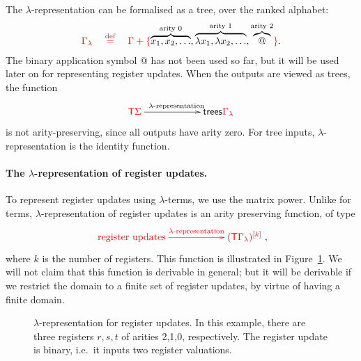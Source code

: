 The  $\lambda$-representation can be formalised as a tree, over the ranked alphabet:
\begin{align*}
{\color{red}{ \Gamma_\lambda \quad \stackrel{\text{def}}=\quad \Gamma + \{{\color{black}{\overbrace{x_1,x_2,\ldots}^\text{arity 0},\overbrace{\lambda x_1,\lambda x_2,\ldots}^\text{arity 1}, \overbrace{@}^{\text{arity 2}}}}\}}}.
\end{align*}
The binary application symbol @ has  not been used so far, but it will be used later on for representing register updates.
When the outputs are viewed as trees, the function
\begin{align}\label{eq:lambda-representation-term}
\xymatrix@C=2cm{
    \tmonad \rSigma 
    \ar[r]^{\text{$\lambda$-representation}} &
    \trees {\ranked{\Gamma_\lambda}}
}
\end{align}
is not arity-preserving, since all outputs have arity zero. For tree inputs, $\lambda$-representation is the identity function. 

\paragraph*{The $\lambda$-representation of register updates.} To represent register updates using $\lambda$-terms, we use  the matrix power. Unlike for terms,    $\lambda$-representation of register updates is an  arity preserving function, of type
\begin{align}\label{eq:lambda-representation-regup}
\ranked{
    \xymatrix@C=2cm{
 \text{register updates}    \ar[r]^-{\text{$\lambda$-representation}} &
 \mati k {(\tmonad\Gamma_\lambda)}
}
},
\end{align}
where $k$ is the number of registers. This function is illustrated in Figure~\ref{fig:labmda-representation-for-register-updates}. 
We will not claim that this function is derivable in general; but it will be derivable if we restrict the domain to a finite set of register updates, by virtue of having a finite domain.



\begin{figure}[]
    \centering
{}    
    \caption{$\lambda$-representation for register updates. In this example, there are three registers $r,s,t$ of arities 2,1,0, respectively. The register update is binary, i.e.~it inputs two register valuations.}
    \label{fig:labmda-representation-for-register-updates}
\end{figure}

